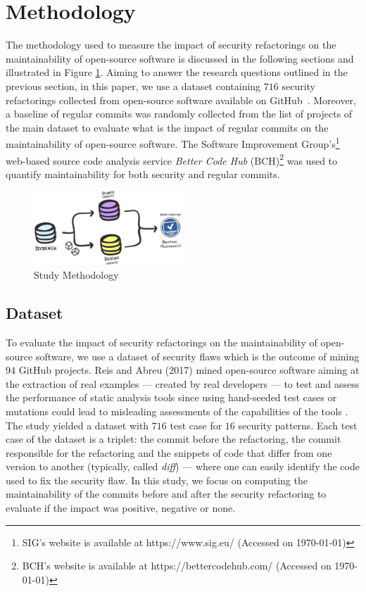 \documentclass[10pt,conference]{IEEEtran}
\begin{document}
\section{Methodology}\label{sec:methodology}
%
The methodology used to measure the impact of security refactorings on the
maintainability of open-source software is discussed in the following sections
and illustrated in Figure \ref{fig:met}. Aiming to answer the research questions
outlined in the previous section, in this paper, we use a dataset containing
$716$ security refactorings collected from open-source software available on
GitHub~\cite{Reis:2017:IJSSE}. Moreover, a baseline of regular commits was
randomly collected from the list of projects of the main dataset to evaluate
what is the impact of regular commits on the maintainability of open-source
software. The Software Improvement Group's\footnote{SIG's website is available
at https://www.sig.eu/ (Accessed on \today{})} web-based source code analysis
service \emph{Better Code Hub} (BCH)\footnote{BCH's website is available at
https://bettercodehub.com/ (Accessed on \today{})} was used to quantify
maintainability for both security and regular commits.
%
\begin{figure}[h]
 	\centering 	\includegraphics[width=0.5\textwidth]{figures/methodology.pdf}
 	\caption{Study Methodology}
	\label{fig:met}
\end{figure}
%
\subsection{Dataset}
%
To evaluate the impact of security refactorings on the maintainability of
open-source software, we use a dataset of security flaws which is the outcome of
mining $94$ GitHub projects. Reis and Abreu (2017) mined open-source
software aiming at the extraction of real examples --- created by real
developers --- to test and assess the performance of static analysis tools since
using hand-seeded test cases or mutations could lead to misleading assessments
of the capabilities of the tools \cite{just2014mutants}. The study yielded a
dataset with $716$ test case for $16$ security patterns. Each test case of the
dataset is a triplet: the commit before the refactoring, the commit responsible
for the refactoring and the snippets of code that differ from one version to
another (typically, called \textit{diff}) --- where one can easily identify the
code used to fix the security flaw. In this study, we focus on computing the
maintainability of the commits before and after the security refactoring to
evaluate if the impact was positive, negative or none.
\end{document}
